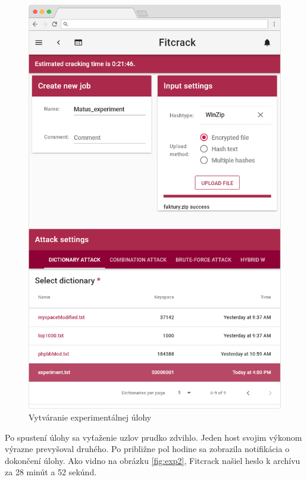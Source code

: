 \documentclass[slovak]{fitthesis}
\begin{document}
\begin{figure}[H]
    \centering
    \includegraphics[scale=0.4]{obrazky/exp1Frame.PNG}
    \caption{Vytváranie experimentálnej úlohy}
    \label{fig:exp1}
\end{figure}
Po spustení úlohy sa vyťaženie uzlov prudko zdvihlo. Jeden host svojim výkonom výrazne prevyšoval druhého. Po približne pol hodine sa zobrazila notifikácia o dokončení úlohy. Ako vidno na obrázku \ref{fig:exp2}, Fitcrack našiel heslo k archívu za 28 minút a 52 sekúnd.
\end{document}
